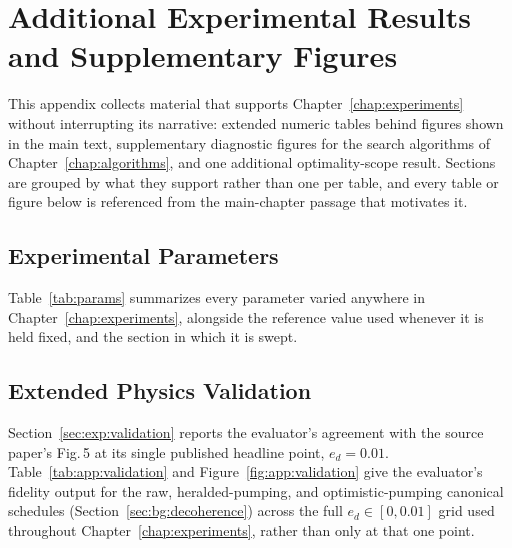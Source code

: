 



\chapter{Additional Experimental Results and Supplementary Figures}
\label{app:results}

This appendix collects material that supports Chapter~\ref{chap:experiments} without interrupting its narrative: extended numeric tables behind figures shown in the main text, supplementary diagnostic figures for the search algorithms of Chapter~\ref{chap:algorithms}, and one additional optimality-scope result. Sections are grouped by what they support rather than one per table, and every table or figure below is referenced from the main-chapter passage that motivates it.

\section{Experimental Parameters}
\label{app:params}

Table~\ref{tab:params} summarizes every parameter varied anywhere in Chapter~\ref{chap:experiments}, alongside the reference value used whenever it is held fixed, and the section in which it is swept.



\section{Extended Physics Validation}
\label{app:validation}

Section~\ref{sec:exp:validation} reports the evaluator's agreement with the source paper's Fig.\,5 at its single published headline point, $e_d=0.01$. Table~\ref{tab:app:validation} and Figure~\ref{fig:app:validation} give the evaluator's fidelity output for the raw, heralded-pumping, and optimistic-pumping canonical schedules (Section~\ref{sec:bg:decoherence}) across the full $e_d \in [0, 0.01]$ grid used throughout Chapter~\ref{chap:experiments}, rather than only at that one point.

